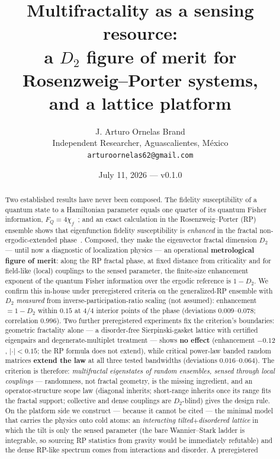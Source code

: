 \documentclass[11pt]{article}
\title{\textbf{Multifractality as a sensing resource:\\ a $D_2$ figure of merit for Rosenzweig--Porter
systems,\\ and a lattice platform}}
\author{J. Arturo Ornelas Brand\\[2pt]
\small Independent Researcher, Aguascalientes, M\'exico\\
\small \texttt{arturoornelas62@gmail.com}}
\date{July 11, 2026 --- v0.1.0}
\newcommand{\chif}{\chi_{f}}
\begin{document}
\maketitle

\begin{abstract}
\noindent Two established results have never been composed. The fidelity susceptibility of a quantum
state to a Hamiltonian parameter equals one quarter of its quantum Fisher information,
$F_Q = 4\chif$~\cite{liu2014,safranek2017}; and an exact calculation in the Rosenzweig--Porter (RP)
ensemble shows that eigenfunction fidelity susceptibility is \emph{enhanced} in the fractal
non-ergodic-extended phase~\cite{sak2022}. Composed, they make the eigenvector fractal dimension
$D_2$ --- until now a diagnostic of localization physics --- an operational \textbf{metrological
figure of merit}: along the RP fractal phase, at fixed distance from criticality and for field-like
(local) couplings to the sensed parameter, the finite-size enhancement exponent of the quantum
Fisher information over the ergodic reference is $1-D_2$. We confirm this in-house under
preregistered criteria on the generalized-RP ensemble with $D_2$ \emph{measured} from
inverse-participation-ratio scaling (not assumed): enhancement $=1-D_2$ within $0.15$ at $4/4$
interior points of the phase (deviations $0.009$--$0.078$; correlation $0.996$). Two further
preregistered experiments fix the criterion's boundaries: geometric fractality alone --- a
disorder-free Sierpinski-gasket lattice with certified eigenpairs and degenerate-multiplet
treatment --- shows \textbf{no effect} (enhancement $-0.12$, $|{\cdot}|<0.15$; the RP formula does
not extend), while critical power-law banded random matrices \textbf{extend the law} at all three
tested bandwidths (deviations $0.016$--$0.064$). The criterion is therefore: \emph{multifractal
eigenstates of random ensembles, sensed through local couplings} --- randomness, not fractal
geometry, is the missing ingredient, and an operator-structure scope law (diagonal inherits;
short-range inherits once its range fits the fractal support; collective and dense couplings are
$D_2$-blind) gives the design rule. On the platform side we construct --- because it cannot be
cited --- the minimal model that carries the physics onto cold atoms: an \emph{interacting
tilted$+$disordered lattice} in which the tilt is only the sensed parameter (the bare
Wannier--Stark ladder is integrable, so sourcing RP statistics from gravity would be immediately
refutable) and the dense RP-like spectrum comes from interactions and disorder. A preregistered

\end{abstract}
\end{document}
